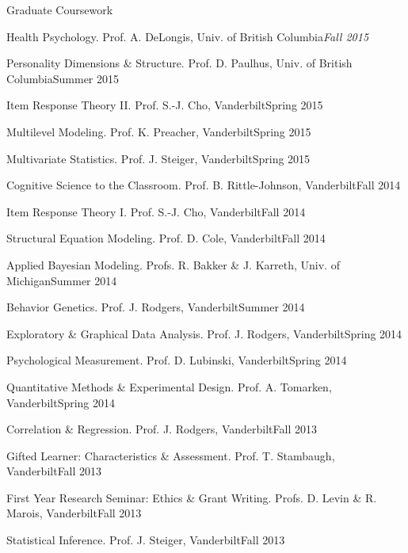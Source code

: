 \documentclass {resume}
\newlength{\wideitemsep}
\let\olditem\item
\renewcommand{\item}{\setlength{\itemsep}{\wideitemsep}\olditem}
\begin{document}
\begin{rSection}{\textrm{Graduate Coursework}}
\begin{etaremune}
\item Health Psychology.  Prof. A. DeLongis, Univ. of British Columbia\hfill  {\textit{Fall 2015}}
\item Personality Dimensions \& Structure.  Prof. D. Paulhus, Univ. of British Columbia\hfill  {Summer 2015}
\item Item Response Theory \textrm{II}. Prof. S.-J. Cho, Vanderbilt\hfill  {Spring 2015}
\item Multilevel Modeling. Prof. K. Preacher, Vanderbilt\hfill  {Spring 2015}
\item Multivariate Statistics. Prof. J. Steiger, Vanderbilt\hfill  {Spring 2015}
\item Cognitive Science to the Classroom. Prof. B. Rittle-Johnson, Vanderbilt\hfill  {Fall 2014}
\item Item Response Theory \textrm{I}. Prof. S.-J. Cho, Vanderbilt\hfill  {Fall 2014}
\item Structural Equation Modeling. Prof. D. Cole, Vanderbilt\hfill  {Fall 2014}
\item Applied Bayesian Modeling. Profs. R. Bakker \& J. Karreth, Univ. of Michigan\hfill  {Summer 2014}
\item Behavior Genetics. Prof. J. Rodgers, Vanderbilt\hfill  {Summer 2014}
\item Exploratory \& Graphical Data Analysis. Prof. J. Rodgers, Vanderbilt\hfill  {Spring 2014}
\item Psychological Measurement. Prof. D. Lubinski, Vanderbilt\hfill  {Spring 2014}
\item Quantitative Methods \& Experimental Design. Prof. A. Tomarken, Vanderbilt\hfill  {Spring 2014}
\item Correlation \& Regression. Prof. J. Rodgers, Vanderbilt\hfill  {Fall 2013}
\item Gifted Learner: Characteristics \& Assessment. Prof. T. Stambaugh, Vanderbilt\hfill  {Fall 2013}
\item First Year Research Seminar: Ethics \& Grant Writing. Profs. D. Levin \& R. Marois, Vanderbilt\hfill  {Fall 2013}
\item Statistical Inference. Prof. J. Steiger, Vanderbilt\hfill  {Fall 2013}

\end{etaremune}
\end{rSection}
\end{document}
